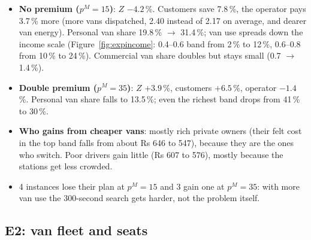 \begin{itemize}
  \item \textbf{No premium ($p^M=15$)}: $Z$ $-4.2$\,\%. Customers save 7.8\,\%, the operator pays 3.7\,\% more (more vans dispatched, 2.40 instead of 2.17 on average, and dearer van energy). Personal van share 19.8\,\% $\to$ 31.4\,\%; van use spreads down the income scale (Figure~\ref{fig:expincome}: 0.4--0.6 band from 2\,\% to 12\,\%, 0.6--0.8 from 10\,\% to 24\,\%). Commercial van share doubles but stays small (0.7 $\to$ 1.4\,\%).
  \item \textbf{Double premium ($p^M=35$)}: $Z$ $+3.9$\,\%, customers $+6.5$\,\%, operator $-1.4$\,\%. Personal van share falls to 13.5\,\%; even the richest band drops from 41\,\% to 30\,\%.
  \item \textbf{Who gains from cheaper vans}: mostly rich private owners (their felt cost in the top band falls from about Rs 646 to 547), because they are the ones who switch. Poor drivers gain little (Rs 607 to 576), mostly because the stations get less crowded.
  \item 4 instances lose their plan at $p^M=15$ and 3 gain one at $p^M=35$: with more van use the 300-second search gets harder, not the problem itself.
\end{itemize}


\subsection{E2: van fleet and seats}

\begin{table}[H]
\centering
\caption{E2. 3 or 7 vans (baseline 5); 4 or 8 cars per van (baseline 6).}

\end{table}

